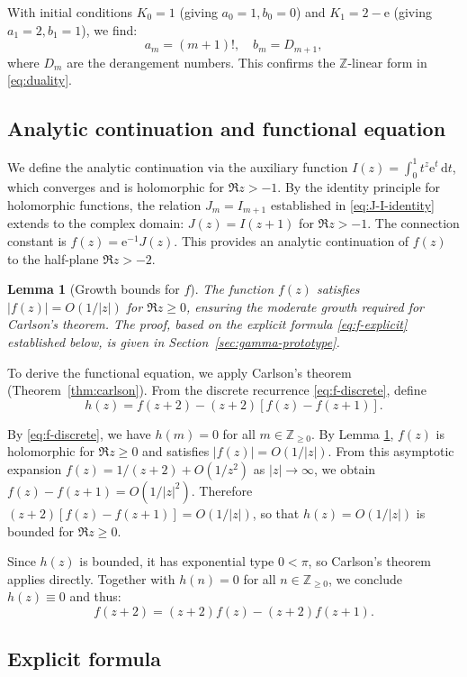 \documentclass[11pt,reqno]{amsart}
\newtheorem{lemma}[theorem]{Lemma}
\theoremstyle{definition}
\newcommand{\N}{\mathbb{Z}_{\ge 0}}
\newcommand{\Z}{\mathbb{Z}}
\newcommand{\dd}{\mathrm{d}}
\newcommand{\ee}{\mathrm{e}}
\numberwithin{equation}{section}
\begin{document}
With initial conditions $K_0 = 1$ (giving $a_0=1, b_0=0$) and $K_1 = 2-\ee$ (giving $a_1=2, b_1=1$), we find:
$$a_m = (m+1)!, \quad b_m = D_{m+1},$$
where $D_m$ are the derangement numbers. This confirms the $\Z$-linear form in \eqref{eq:duality}.

\subsection{Analytic continuation and functional equation}

We define the analytic continuation via the auxiliary function $I(z) = \int_0^1 t^z\ee^t\, \dd t$, which converges and is holomorphic for $\Re z > -1$. By the identity principle for holomorphic functions, the relation $J_m = I_{m+1}$ established in \eqref{eq:J-I-identity} extends to the complex domain: $J(z) = I(z+1)$ for $\Re z > -1$. The connection constant is $f(z) = \ee^{-1}J(z)$. This provides an analytic continuation of $f(z)$ to the half-plane $\Re z > -2$.

\begin{lemma}[Growth bounds for $f$]\label{lem:growth-f}
The function $f(z)$ satisfies $|f(z)| = O(1/|z|)$ for $\Re z \geq 0$, ensuring the moderate growth required for Carlson's theorem. The proof, based on the explicit formula \eqref{eq:f-explicit} established below, is given in Section~\ref{sec:gamma-prototype}.
\end{lemma}

To derive the functional equation, we apply Carlson's theorem (Theorem~\ref{thm:carlson}). From the discrete recurrence \eqref{eq:f-discrete}, define 
$$h(z) = f(z+2) - (z+2)[f(z) - f(z+1)].$$

By \eqref{eq:f-discrete}, we have $h(m)=0$ for all $m\in\N$. By Lemma \ref{lem:growth-f}, $f(z)$ is holomorphic for $\Re z \geq 0$ and satisfies $|f(z)| = O(1/|z|)$. From this asymptotic expansion $f(z) = 1/(z+2) + O(1/z^2)$ as $|z|\to\infty$, we obtain $f(z)-f(z+1) = O(1/|z|^2)$. Therefore $(z+2)[f(z)-f(z+1)] = O(1/|z|)$, so that $h(z) = O(1/|z|)$ is bounded for $\Re z \geq 0$.

Since $h(z)$ is bounded, it has exponential type $0 < \pi$, so Carlson's theorem applies directly. Together with $h(n)=0$ for all $n\in\N$, we conclude $h(z) \equiv 0$ and thus:
\begin{equation}\label{eq:f-AFE}
f(z+2) = (z+2)f(z) - (z+2)f(z+1).
\end{equation}

\subsection{Explicit formula}
\end{document}
